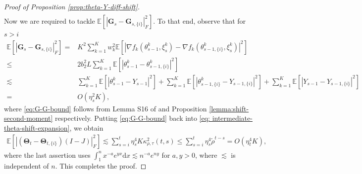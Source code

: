 \documentclass[a4paper,11pt]{article}
\numberwithin{equation}{section}
\theoremstyle{plain}
\theoremstyle{remark}
\def\IE{\mathbb{E}}
\def\bG{\mathbf{G}}
\def\bT{\mathbf{\Theta}}
\newcommand{\shift}[2]{#1_{#2, \{i\}}}
\begin{document}
\begin{proof}[Proof of Proposition \ref{prop:theta-Y-diff-shift}]
\begin{align}
    \end{align}
    Now we are required to tackle $\IE[|\bG_s - \shift{\bG}{s}|_F^2]$. To that end, observe that for $s > i$
    \begin{align}
        \IE[|\bG_s - \shift{\bG}{s}|_F^2] = & K^2 \sum_{k=1}^K w_k^2 \IE[|\nabla f_k(\theta_{s-1}^k, \xi_s^k) - \nabla f_k(\shift{\theta}{s-1}^k, \xi_s^k)|^2] \nonumber\\
        \leq & 2b_2^2L \sum_{k=1}^K \IE[|\theta_{s-1}^k - \shift{\theta}{s-1}^k|^2] \nonumber\\
        \lesssim & \sum_{k=1}^K \IE[|\theta_{s-1}^k - Y_{s-1}|^2] + \sum_{k=1}^K \IE[|\shift{\theta}{s-1}^k - \shift{Y}{s-1}|^2] + \sum_{k=1}^K \IE[|Y_{s-1}-\shift{Y}{s-1}|^2] \nonumber \\
        = & O(\eta_s^2K) \label{eq:G-G-bound},
    \end{align}
    where \eqref{eq:G-G-bound} follows from Lemma S16 of \cite{songxichen2024} and Proposition \ref{lemma:shift-second-moment} respectively. Putting \eqref{eq:G-G-bound} back into \eqref{eq: intermediate-theta-shift-expansion}, we obtain 
    \begin{align*}
        \IE[|(\bT_t -\shift{\bT}{t})(I-J)|_F^2] \lesssim  \sum_{s=i}^t \eta_s^4 K \kappa_{\rho, \tau}^2 (t,s)
        \leq \sum_{s=i}^t \eta_s^4 \tilde{\rho}^{t-s} = O(\eta_t^4K ),
    \end{align*}
    where the last assertion uses $\int_1^n x^{-a} e^{yx} \text{d}x \lesssim n^{-a}e^{ny}$ for $a,y>0$, where $\lesssim$ is independent of $n$. This completes the proof. 
\end{proof}
\end{document}
